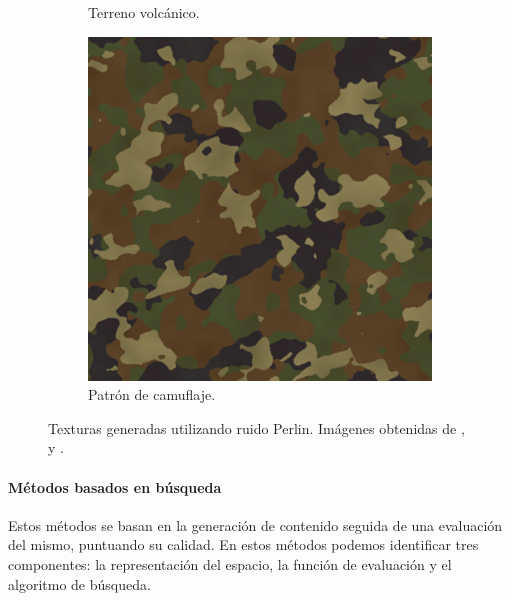 \begin{figure}[H]
\begin{center}
\begin{subfigure}[b]{0.3\textwidth}
            \caption{Terreno volcánico.}
        \end{subfigure}
        \hfill
        \begin{subfigure}[b]{0.3\textwidth}
            \centering
            \includegraphics[scale=0.224]{img/camufaje.png}
            \caption{Patrón de camuflaje.}
        \end{subfigure}
        \caption{Texturas generadas utilizando ruido Perlin. Imágenes obtenidas de \cite{redPerlin}, \cite{lavaPerlin} y \cite{camuflajePerlin}.}
    \end{center}
\end{figure}

\paragraph{Métodos basados en búsqueda}
Estos métodos se basan en la generación de contenido seguida de una evaluación del mismo, puntuando su calidad. En estos métodos podemos identificar tres componentes: la representación del espacio, la función de evaluación y el algoritmo de búsqueda.

